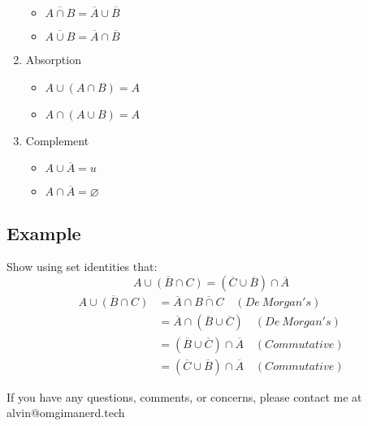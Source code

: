 \documentclass[letterpaper, 12pt]{math}
\begin{document}
\begin{enumerate}
  \begin{itemize}
    \item \( \overline{A \cap B} = \overline{A} \cup \overline{B} \)
    \item \( \overline{A \cup B} = \overline{A} \cap \overline{B} \)
  \end{itemize}
  \item Absorption
  \begin{itemize}
    \item \( A \cup (A \cap B) = A \)
    \item \( A \cap (A \cup B) = A \)
  \end{itemize}
  \item Complement
  \begin{itemize}
    \item \( A \cup \overline{A} = u \)
    \item \( A \cap \overline{A} = \varnothing \)
  \end{itemize}
\end{enumerate}

\subsection*{Example}
Show using set identities that:
\[ \overline{A \cup (B \cap C)} = (\overline{C} \cup \overline{B}) \cap
   \overline{A} \]
\begin{align*}
  \overline{A \cup (B \cap C)} &=
    \overline{A} \cap \overline{B \cap C} \quad (De\ Morgan's) \\
  &= \overline{A} \cap (\overline{B} \cup \overline{C}) \quad (De\ Morgan's) \\
  &= (\overline{B} \cup \overline{C}) \cap \overline{A} \quad (Commutative) \\
  &= (\overline{C} \cup \overline{B}) \cap \overline{A} \quad (Commutative)
\end{align*}

\begin{center}
  If you have any questions, comments, or concerns, please contact me at
  alvin@omgimanerd.tech
\end{center}
\end{document}
